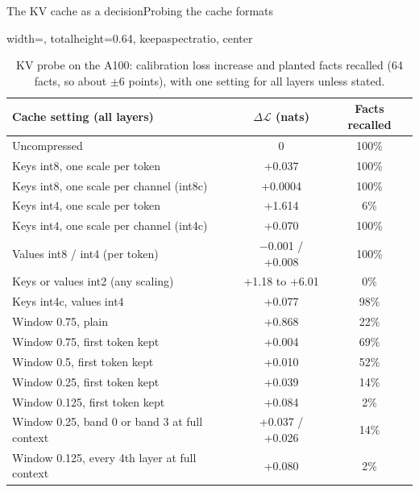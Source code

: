 \documentclass[aspectratio=169,10pt]{beamer}
\newcommand{\dloss}{\Delta\mathcal{L}}
\begin{document}
\begin{frame}{The KV cache as a decision}{Probing the cache formats}
\begin{table}
\centering
\begin{adjustbox}{width=\linewidth, totalheight=0.64\textheight, keepaspectratio, center}
\centering
\small
\begin{tabular}{lcc}
\toprule
Cache setting (all layers) & $\dloss$ (nats) & Facts recalled \\
\midrule
Uncompressed                                         & 0       & 100\% \\
\midrule
Keys int8, one scale per token                       & +0.037  & 100\% \\
Keys int8, one scale per channel (int8c)             & +0.0004 & 100\% \\
Keys int4, one scale per token                       & +1.614  & 6\%   \\
Keys int4, one scale per channel (int4c)             & +0.070  & 100\% \\
Values int8 / int4 (per token)                       & $-$0.001 / +0.008 & 100\% \\
Keys or values int2 (any scaling)                    & +1.18 to +6.01 & 0\% \\
Keys int4c, values int4                              & +0.077  & 98\%  \\
\midrule
Window 0.75, plain                                   & +0.868  & 22\%  \\
Window 0.75, first token kept                        & +0.004  & 69\%  \\
Window 0.5, first token kept                         & +0.010  & 52\%  \\
Window 0.25, first token kept                        & +0.039  & 14\%  \\
Window 0.125, first token kept                       & +0.084  & 2\%   \\
Window 0.25, band 0 or band 3 at full context        & +0.037 / +0.026 & 14\% \\
Window 0.125, every 4th layer at full context        & +0.080  & 2\%   \\
\bottomrule
\end{tabular}
\end{adjustbox}
\caption{KV probe on the A100: calibration loss increase and planted facts recalled (64 facts, so about
$\pm6$ points), with one setting for all layers unless stated.}\label{tab:kv-probe}
\end{table}
\end{frame}
\end{document}
